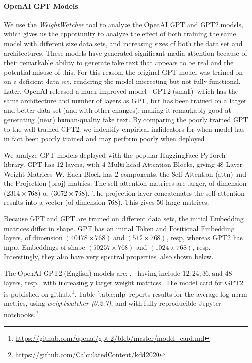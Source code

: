 \paragraph{OpenAI GPT Models.}

We use the \emph{WeightWatcher} tool to analyze the OpenAI GPT and GPT2 models, which gives us
the opportunity to analyze the effect of both training the same model with different size data sets,
and increasing sizes of both the data set and architectures.
These models have generated significant media attention because of their remarkable ability to
 generate fake text that appears to be real and the potential misuse of this.
For this reason, the original GPT model was trained on on a deficient data set, rendering
the model interesting but not fully functional.  Later, OpenAI released a much improved model--
GPT2 (small)--which has the same architecture and number of layers as GPT, but has
been trained on a larger and better data set (and with other changes), making it
remarkably good at generating (near) human-quality fake text.  
By comparing the poorly trained GPT to the well trained GPT2, we
indentify empirical indidcators for when  model has in fact
been poorly trained and may perform poorly when deployed.

We analyze GPT models deployed with the popular HuggingFace PyTorch library.
GPT has 12 layers, with 4 Multi-head Attention Blocks, giving $48$ Layer Weight Matrices $\mathbf{W}$.
Each Block has 2 components, the Self Attention (attn) and the Projection (proj) matrics.  
The self-attention  matrices are larger, of dimension ($2304\times 768$) or ($3072\times 768$).
The projection layer concatenates the self-attention results into a vector (of dimension $768$).
This gives $50$ large matrices.

Because GPT and GPT are trained on different data sets, the initial Embedding matrices differ in shape.
GPT  has an initial Token and Positional Embedding layers, of dimension
$(40478\times 768)$ and $(512\times 768)$, resp, whereas GPT2 has input Embeddings of shape
$(50257\times 768)$ and $(1024\times 768)$, resp.  Interstingly, they also have very spectral properties,
also shown below.

The OpenAI GPT2 (English) models are: , \
having include $12, 24, 36, \text{and }48$ layers, resp., with increasingly larger weight matrices.
The model card for GPT2 is published on github.\footnote{\url{https://github.com/openai/gpt-2/blob/master/model_card.md}}.
Table \ref{table:nlp} reports results for the average log norm metrics, using \emph{weightwatcher (0.2.7)},
and with fully reproducible Jupyter notebooks.\footnote{\url{https://github.com/CalculatedContent/kdd2020}}

